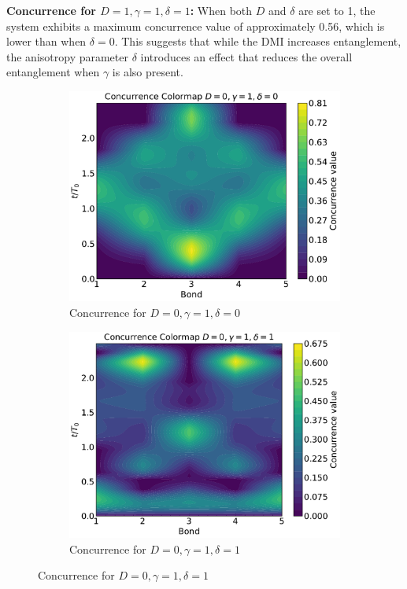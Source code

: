 \textbf{Concurrence for \( D = 1, \gamma = 1, \delta = 1 \):} 
When both \(D\) and \(\delta\) are set to 1, the system exhibits a maximum concurrence value of approximately 0.56, 
which is lower than when \(\delta = 0\). This suggests that while the DMI increases entanglement, the anisotropy 
parameter \(\delta\) introduces an effect that reduces the overall entanglement when \(\gamma\) is also present.
\begin{figure}[h!]
    \centering
    \begin{subfigure}[b]{0.48\textwidth}
        \centering
        \includegraphics[width=\linewidth]{results_and_discussion/6_qubits/up_down_with_ana_0_1_0.pdf}
        \caption{Concurrence for \( D = 0, \gamma = 1, \delta = 0 \)}
        \label{fig:6q_0_1_0}
    \end{subfigure}
    \hfill
    \begin{subfigure}[b]{0.48\textwidth}
        \centering
        \includegraphics[width=\linewidth]{results_and_discussion/6_qubits/up_down_with_ana_0_1_1.pdf}
        \caption{Concurrence for \( D = 0, \gamma = 1, \delta = 1 \)}
        \label{fig:6q_0_1_1}
    \end{subfigure}


\end{figure}
